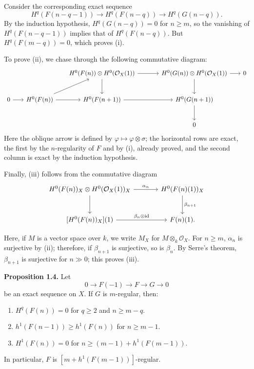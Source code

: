 Consider the corresponding exact sequence
\[
  H^q(F(n-q-1))\longrightarrow H^q(F(n-q))
  \longrightarrow H^q(G(n-q)).
\]
By the induction hypothesis, \(H^q(G(n-q))=0\) for \(n\geq m\), so the
vanishing of \(H^q(F(n-q-1))\) implies that of \(H^q(F(n-q))\). But
\(H^q(F(m-q))=0\), which proves (i).

To prove (ii), we chase through the following commutative diagram:
\[
\begin{tikzcd}[column sep=1.7em,row sep=2.4em]
  & & H^0(F(n))\otimes H^0(\mathcal O_X(1))
      \arrow[rr] \arrow[d]
  & & H^0(G(n))\otimes H^0(\mathcal O_X(1))
      \arrow[r] \arrow[d]
  & 0 \\
  0 \arrow[r]
  & H^0(F(n)) \arrow[ur] \arrow[r]
  & H^0(F(n+1)) \arrow[rr]
  & & H^0(G(n+1)) \arrow[d] \\
  & & & & 0
\end{tikzcd}
\]
Here the oblique arrow is defined by
\(\varphi\mapsto\varphi\otimes\sigma\); the horizontal rows are exact, the
first by the \(n\)-regularity of \(F\) and by (i), already proved, and the
second column is exact by the induction hypothesis.

Finally, (iii) follows from the commutative diagram
\[
\begin{tikzcd}[column sep=large,row sep=large]
H^0(F(n))_X\otimes H^0(\mathcal O_X(1))_X
  \arrow[r,"\alpha_n"]
  \arrow[d]
& H^0(F(n)(1))_X
  \arrow[d,"\beta_{n+1}"] \\
{[H^0(F(n))_X](1)}
  \arrow[r,"\beta_n\otimes\mathrm{id}"]
& F(n)(1).
\end{tikzcd}
\]

\newpage
Here, if \(M\) is a vector space over \(k\), we write \(M_X\) for
\(M\otimes_k\mathcal O_X\). For \(n\geq m\), \(\alpha_n\) is surjective
by (ii); therefore, if \(\beta_{n+1}\) is surjective, so is \(\beta_n\). By
Serre's theorem, \(\beta_{n+1}\) is surjective for \(n\gg0\); this proves
(iii).

\textbf{Proposition 1.4.} Let
\[
  0\longrightarrow F(-1)\longrightarrow F\longrightarrow G\longrightarrow0
\]
be an exact sequence on \(X\). If \(G\) is \(m\)-regular, then:
\begin{enumerate}[label=(\roman*)]
\item \(H^q(F(n))=0\) for \(q\geq2\) and \(n\geq m-q\).
\item \(h^1(F(n-1))\geq h^1(F(n))\) for \(n\geq m-1\).
\item \(H^1(F(n))=0\) for
\(n\geq(m-1)+h^1(F(m-1))\).
\end{enumerate}
In particular, \(F\) is \([m+h^1(F(m-1))]\)-regular.

